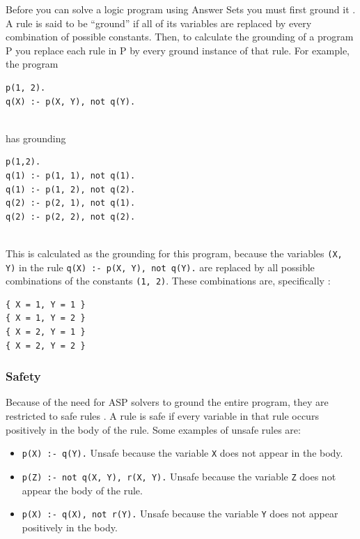 Before you can solve a logic program using Answer Sets you must first ground it \cite{KRnotes}. A rule is said to be ``ground'' if all of its variables are replaced by every combination of possible constants. Then, to calculate the grounding of a program P you replace each rule in P by every ground instance of that rule. For example, the program \\

\begin{lstlisting}
p(1, 2).
q(X) :- p(X, Y), not q(Y).
\end{lstlisting}
\mbox{}\\
has grounding \\

\begin{lstlisting}
p(1,2).
q(1) :- p(1, 1), not q(1).
q(1) :- p(1, 2), not q(2).
q(2) :- p(2, 1), not q(1).
q(2) :- p(2, 2), not q(2).
\end{lstlisting}
\mbox{}\\
This is calculated as the grounding for this program, because the variables \lstinline{(X, Y)} in the rule \lstinline{q(X) :- p(X, Y), not q(Y).} are replaced by all possible combinations of the constants \lstinline{(1, 2)}. These combinations are, specifically :\\%

\begin{lstlisting}
{ X = 1, Y = 1 }
{ X = 1, Y = 2 }
{ X = 2, Y = 1 }
{ X = 2, Y = 2 }
\end{lstlisting}

\subsubsection{Safety}

Because of the need for ASP solvers to ground the entire program, they are restricted to safe rules \cite{Cabalar2009}. A rule is safe if every variable in that rule occurs positively in the body of the rule. Some examples of unsafe rules are:

\begin{itemize}
\item \lstinline!p(X) :- q(Y).! Unsafe because the variable \lstinline!X! does not appear in the body. 
\item \lstinline!p(Z) :- not q(X, Y), r(X, Y).! Unsafe because the variable \lstinline!Z! does not appear the body of the rule.
\item \lstinline!p(X) :- q(X), not r(Y).! Unsafe because the variable \lstinline!Y! does not appear positively in the body.
\end{itemize}

